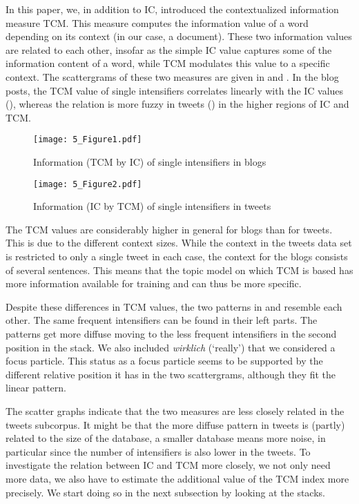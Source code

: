 \documentclass[output=paper,colorlinks,citecolor=brown]{langscibook}
\begin{document}
In this paper, we, in addition to IC, introduced the contextualized information measure TCM. This measure computes the information value of a word depending on its context (in our case, a document). These two information values are related to each other, insofar as the simple IC value captures some of the information content of a word, while TCM modulates this value to a specific context. The scattergrams of these two measures are given in  and . In the blog posts, the TCM value of single intensifiers correlates linearly with the IC values (), whereas the relation is more fuzzy in tweets () in the higher regions of IC and TCM.

\begin{figure}
\texttt{[image: 5\_Figure1.pdf]}
\caption{Information (TCM by IC) of single intensifiers in blogs}
\label{fig:single1}
\end{figure}

\begin{figure}
\texttt{[image: 5\_Figure2.pdf]}
\caption{Information (IC by TCM) of single intensifiers in tweets}
\label{fig:single2}
\end{figure}

The TCM values are considerably higher in general for blogs than for tweets. This is due to the different context sizes. While the context in the tweets data set is restricted to only a single tweet in each case, the context for the blogs consists of several sentences. This means that the topic model on which TCM is based has more information available for training and can thus be more specific. 

Despite these differences in TCM values, the two patterns in  and  resemble each other. The same frequent intensifiers can be found in their left parts. The patterns get more diffuse moving to the less frequent intensifiers in the second position in the stack.
We also included \textit{wirklich} (`really') that we considered a focus particle. This status as a focus particle seems to be supported by the different relative position it has in the two scattergrams, although they fit the linear pattern.

The scatter graphs indicate that the two measures are less closely related in the tweets subcorpus. It might be that the more diffuse pattern in tweets is (partly) related to the size of the database, a smaller database means more noise, in particular since the number of intensifiers is also lower in the tweets. To investigate the relation between IC and TCM more closely, we not only need more data, we also have to estimate the additional value of the TCM index more precisely. We start doing so in the next subsection by looking at the stacks.
\end{document}
